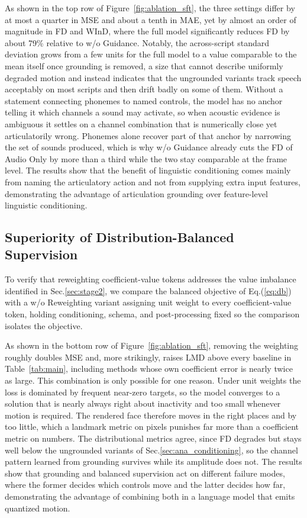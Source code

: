 As shown in the top row of Figure~\ref{fig:ablation_sft}, the three settings differ by at most a quarter in MSE and about a tenth in MAE, yet by almost an order of magnitude in FD and WInD, where the full model significantly reduces FD by about 79\% relative to w/o Guidance. Notably, the across-script standard deviation grows from a few units for the full model to a value comparable to the mean itself once grounding is removed, a size that cannot describe uniformly degraded motion and instead indicates that the ungrounded variants track speech acceptably on most scripts and then drift badly on some of them. Without a statement connecting phonemes to named controls, the model has no anchor telling it which channels a sound may activate, so when acoustic evidence is ambiguous it settles on a channel combination that is numerically close yet articulatorily wrong. Phonemes alone recover part of that anchor by narrowing the set of sounds produced, which is why w/o Guidance already cuts the FD of Audio Only by more than a third while the two stay comparable at the frame level. The results show that the benefit of linguistic conditioning comes mainly from naming the articulatory action and not from supplying extra input features, demonstrating the advantage of articulation grounding over feature-level linguistic conditioning.

\subsection{Superiority of Distribution-Balanced Supervision}
\label{sec:ana_reweight}

To verify that reweighting coefficient-value tokens addresses the value imbalance identified in Sec.\ref{sec:stage2}, we compare the balanced objective of Eq.(\ref{eq:db}) with a w/o Reweighting variant assigning unit weight to every coefficient-value token, holding conditioning, schema, and post-processing fixed so the comparison isolates the objective.

As shown in the bottom row of Figure~\ref{fig:ablation_sft}, removing the weighting roughly doubles MSE and, more strikingly, raises LMD above every baseline in Table~\ref{tab:main}, including methods whose own coefficient error is nearly twice as large. This combination is only possible for one reason. Under unit weights the loss is dominated by frequent near-zero targets, so the model converges to a solution that is nearly always right about inactivity and too small whenever motion is required. The rendered face therefore moves in the right places and by too little, which a landmark metric on pixels punishes far more than a coefficient metric on numbers. The distributional metrics agree, since FD degrades but stays well below the ungrounded variants of Sec.\ref{sec:ana_conditioning}, so the channel pattern learned from grounding survives while its amplitude does not. The results show that grounding and balanced supervision act on different failure modes, where the former decides which controls move and the latter decides how far, demonstrating the advantage of combining both in a language model that emits quantized motion.

